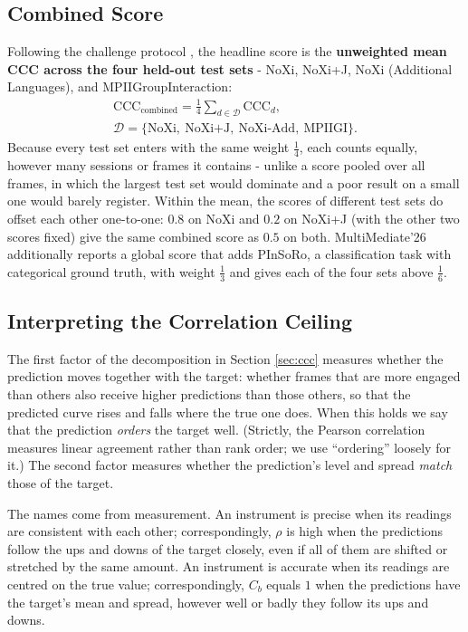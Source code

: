 \documentclass[10pt,a4paper,twocolumn]{article}
\begin{document}
	\subsection*{Combined Score}
	Following the challenge protocol \cite{withanage25}, the headline score is the \textbf{unweighted mean CCC across the four held-out test sets} - NoXi, NoXi+J, NoXi (Additional Languages), and MPIIGroupInteraction:
	$$
	\begin{gathered}\text{CCC}_{\text{combined}} = \frac{1}{4}\sum_{d \in \mathcal{D}} \text{CCC}_d, \\ \mathcal{D} = \{\text{NoXi},\ \text{NoXi+J},\ \text{NoXi-Add},\ \text{MPIIGI}\}.\end{gathered}
	$$
	Because every test set enters with the same weight $\tfrac{1}{4}$, each counts equally, however many sessions or frames it contains - unlike a score pooled over all frames, in which the largest test set would dominate and a poor result on a small one would barely register. Within the mean, the scores of different test sets do offset each other one-to-one: $0.8$ on NoXi and $0.2$ on NoXi+J (with the other two scores fixed) give the same combined score as $0.5$ on both. MultiMediate'26 additionally reports a global score that adds PInSoRo, a classification task with categorical ground truth, with weight $\tfrac{1}{3}$ and gives each of the four sets above $\tfrac{1}{6}$.
	
	\subsection*{Interpreting the Correlation Ceiling}
	The first factor of the decomposition in Section \ref{sec:ccc} measures whether the prediction moves together with the target: whether frames that are more engaged than others also receive higher predictions than those others, so that the predicted curve rises and falls where the true one does. When this holds we say that the prediction \emph{orders} the target well. (Strictly, the Pearson correlation measures linear agreement rather than rank order; we use ``ordering'' loosely for it.) The second factor measures whether the prediction's level and spread \emph{match} those of the target.
	
	The names come from measurement. An instrument is precise when its readings are consistent with each other; correspondingly, $\rho$ is high when the predictions follow the ups and downs of the target closely, even if all of them are shifted or stretched by the same amount. An instrument is accurate when its readings are centred on the true value; correspondingly, $C_b$ equals $1$ when the predictions have the target's mean and spread, however well or badly they follow its ups and downs.
	
\end{document}
